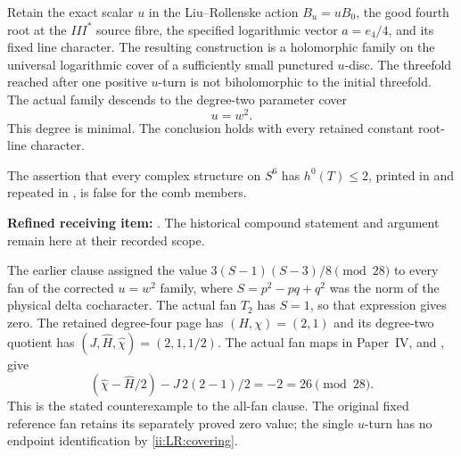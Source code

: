 \begin{theorem}\label{ii:LR:covering}
Retain the exact scalar $u$ in the Liu--Rollenske action $B_u=uB_0$,
the good fourth root at the $III^*$ source fibre, the specified
logarithmic vector $a=e_4/4$, and its fixed line character.
The resulting construction is a holomorphic family on the universal
logarithmic cover of a sufficiently small punctured $u$-disc.
The threefold reached after one positive $u$-turn is not
biholomorphic to the initial threefold. The actual family descends
to the degree-two parameter cover
\[
                         u=w^2.\tag{LR.1}
\]
This degree is minimal. The conclusion holds with every retained
constant root-line character.
\end{theorem}

\begin{proposition}\label{inv:E2.4}

The assertion that every complex structure on $S^6$ has
$h^0(T)\le2$, printed in
\citet[Corollary 1.3; verified preprint p.~2]{HKP2000}
and repeated in \citet[Remarks 1.2 and 9.26]{AC2026}, is false
for the comb members.
\end{proposition}

\begin{refuted}\label{night:P3K.36}\label{stmt:P3K.36}
\par\noindent\textbf{Refined receiving item:} . The historical compound statement and argument remain here at their recorded scope.\par

The earlier clause assigned the value
$3(S-1)(S-3)/8\pmod {28}$ to every fan of the corrected
$u=w^2$ family, where $S=p^2-pq+q^2$ was the norm of the
physical delta cocharacter. The actual fan $T_2$ has $S=1$,
so that expression gives zero. The retained degree-four
page has $(H,\chi)=(2,1)$ and its degree-two quotient has
$(J,\widehat H,\widehat\chi)=(2,1,1/2)$.
The actual fan maps in Paper~IV,  and
, give
\[
 (\widehat\chi-\widehat H/2)-J\,2(2-1)/2
                           =-2=26\pmod {28}.
\]
This is the stated counterexample to the all-fan clause.
The original fixed reference fan retains its separately
proved zero value; the single $u$-turn has no endpoint
identification by \ref{ii:LR:covering}.
\end{refuted}

